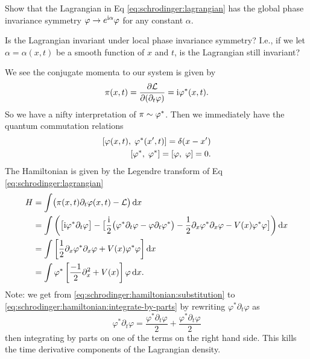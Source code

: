 \begin{xca}[Symmetry]
Show that the Lagrangian in Eq \eqref{eq:schrodinger:lagrangian} has the
global phase invariance symmetry $\varphi\to e^{\mathrm{i}\alpha}\varphi$
for any constant $\alpha$. 

Is the Lagrangian invariant under local phase invariance symmetry? I.e.,
if we let $\alpha=\alpha(x,t)$ be a smooth function of $x$ and $t$, is
the Lagrangian still invariant?
\end{xca}

\label{subsec:schrodinger:canonical}
We see the conjugate momenta to our system
 is given by
\begin{equation}\label{eq:schrodinger:momenta-density}
\pi(x,t)=\frac{\partial\mathcal{L}}{\partial(\partial_{t}\varphi)}=\mathrm{i}\varphi^{*}(x,t).
\end{equation}
So we have a nifty interpretation of $\pi\sim\varphi^{*}$. Then we
immediately have the quantum commutation relations
\begin{equation}\label{eq:schrodinger:ccr}
\begin{split}
\left\lbrack\varphi(x,t),\;\varphi^{*}(x',t)\right\rbrack=\delta(x-x')\\
\left\lbrack\varphi^{*},\;\varphi^{*}\right\rbrack=\left\lbrack\varphi,\;\varphi\right\rbrack=0.
\end{split}
\end{equation}
The Hamiltonian is given by the Legendre transform of Eq
\eqref{eq:schrodinger:lagrangian}
\begin{subequations}\label{eq:schrodinger:hamiltonian}
\begin{align}
H&=\int\bigl(\pi(x,t)\partial_{t}\varphi(x,t)-\mathcal{L}\bigr)\,\mathrm{d} x\\
&=\int\left(\bigl[\mathrm{i}\varphi^{*}\partial_{t}\varphi\bigr]
-\bigl[\frac{\mathrm{i}}{2}\bigl(\varphi^{*}\partial_{t}\varphi-\varphi\partial_{t}\varphi^{*}\bigr)
-\frac{1}{2}\partial_{x}\varphi^{*}\partial_{x}\varphi-V(x)\varphi^{*}\varphi\bigr]\right)\mathrm{d}
x\label{eq:schrodinger:hamiltonian:substitution}\\
&=\int\left[\frac{1}{2}\partial_{x}\varphi^{*}\partial_{x}\varphi+V(x)\varphi^{*}\varphi\right]\mathrm{d}
x\label{eq:schrodinger:hamiltonian:integrate-by-parts}\\
&=\int\varphi^{*}\left[\frac{-1}{2}\partial_{x}^{2}+V(x)\right]\varphi\,\mathrm{d}
x.
\end{align}
\end{subequations}
Note: we get from \eqref{eq:schrodinger:hamiltonian:substitution}
to \eqref{eq:schrodinger:hamiltonian:integrate-by-parts} by rewriting
$\varphi^{*}\partial_{t}\varphi$ as
\begin{equation}
\varphi^{*}\partial_{t}\varphi =
\frac{\varphi^{*}\partial_{t}\varphi}{2}+\frac{\varphi^{*}\partial_{t}\varphi}{2}
\end{equation}
then integrating by parts on one of the terms on the right hand
side. This kills the time derivative components of the Lagrangian
density.

